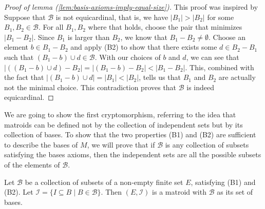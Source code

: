 \begin{proof}[Proof of lemma (\ref{lem:basis-axioms-imply-equal-size})]
    This proof was inspired by \cite[p. 8]{oxley1} Suppose that $\mathcal{B}$ is not equicardinal, that is, we have $|B_1|>|B_2|$ for some $B_1,B_2\in\mathcal{B}$. For all $B_1,B_2$ where that holds, choose the pair that minimizes $|B_1-B_2|$. Since $B_1$ is larger than $B _2$, we know that $B _1 - B _2 \neq \emptyset$. Choose an element $b\in B_1-B_2$ and apply (B2) to show that there exists some $d\in B_2-B_1$ such that $(B_1-b)\cup d \in\mathcal{B}$. With our choices of $b$ and $d$, we can see that $|((B_1-b)\cup d)-B_2|=|(B_1-b)-B_2|<|B_1-B_2|$. This, combined with the fact that $|(B_1-b)\cup d|=|B_1|<|B_2|$, tells us that $B_1$ and $B_2$ are actually not the minimal choice. This contradiction proves that $\mathcal{B}$ is indeed equicardinal.
\end{proof}

We are going to show the first cryptomorphism, referring to the idea that matroids can be defined not by the collection of independent sets but by its collection of bases. To show that the two properties (B1) and (B2) are sufficient to describe the bases of $M$, we will prove that if $\mathcal{B}$ is any collection of subsets satisfying the bases axioms, then the independent sets are all the possible subsets of the elements of $\mathcal{B}$.

\begin{theorem}\label{thm:basis-axioms-form-matroid}
    Let $\mathcal{B}$ be a collection of subsets of a non-empty finite set $E$, satisfying (B1) and (B2). Let $\mathcal{I}=\{ I\subseteq B \; | \; B\in\mathcal{B} \}$. Then $(E,\mathcal{I})$ is a matroid with $\mathcal{B}$ as its set of bases.
\end{theorem}



